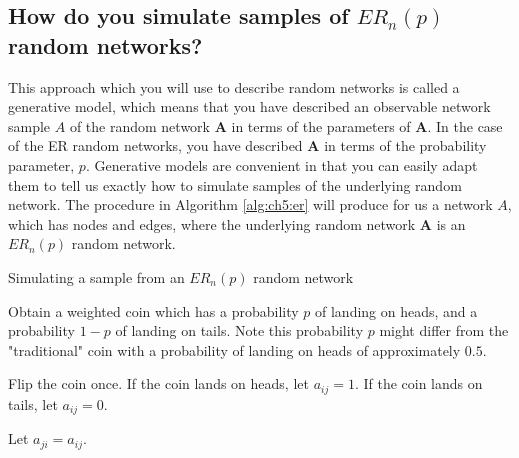 \subsection{How do you simulate samples of $ER_n(p)$ random networks?}

This approach which you will use to describe random networks is called a {generative model}, which means that you have described an observable network sample $A$ of the random network $\mathbf A$ in terms of the parameters of $\mathbf A$. In the case of the ER random networks, you have described $\mathbf A$ in terms of the probability parameter, $p$. Generative models are convenient in that you can easily adapt them to tell us exactly how to simulate samples of the underlying random network. The procedure in Algorithm \ref{alg:ch5:er} will produce for us a network $A$, which has nodes and edges, where the underlying random network $\mathbf A$ is an $ER_n(p)$ random network.

\begin{algorithm}[h]\caption{Simulating a sample from an $ER_n(p)$ random network}
\label{alg:ch5:er}
\SetAlgoLined
{}

Obtain a weighted coin which has a probability $p$ of landing on heads, and a probability $1 - p$ of landing on tails. Note this probability $p$ might differ from the "traditional" coin with a probability of landing on heads of approximately $0.5$.

 {
     {
        Flip the coin once. If the coin lands on heads, let $a_{ij} = 1$. If the coin lands on tails, let $a_{ij} = 0$.

        Let $a_{ji} = a_{ij}$.
    }
}

\end{algorithm}

